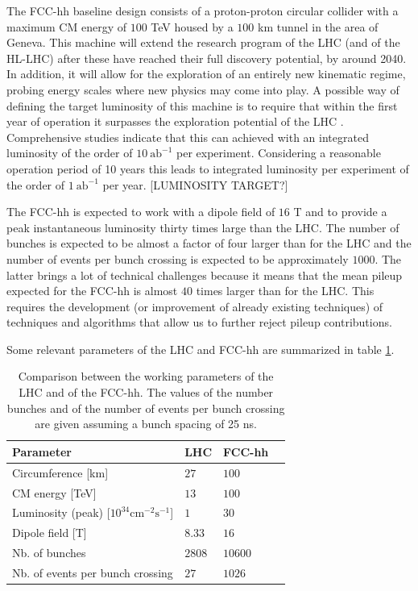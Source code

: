The FCC-hh baseline design consists of a proton-proton circular collider with a maximum CM energy of $100$ TeV housed by a $100$ km tunnel in the area of Geneva. This machine will extend the research program of the LHC (and of the HL-LHC) after these have reached their full discovery potential, by around 2040. In addition, it will allow for the exploration of an entirely new kinematic regime, probing energy scales where new physics may come into play. A possible way of defining the target luminosity of this machine is to require that within the first year of operation it surpasses the exploration potential of the LHC \cite{FCClumi}. Comprehensive studies \cite{FCCphys,FCClumi} indicate that this can achieved with an integrated luminosity of the order of $10~\text{ab}^{-1}$ per experiment. Considering a reasonable operation period of 10 years this leads to integrated luminosity per experiment of the order of $1~\text{ab}^{-1}$ per year. [LUMINOSITY TARGET?]

The FCC-hh is expected to work with a dipole field of $16$ T and to provide a peak instantaneous luminosity thirty times large than the LHC. The number of bunches is expected to be almost a factor of four larger than for the LHC and the number of events per bunch crossing is expected to be approximately $1000$. The latter brings a lot of technical challenges because it means that the mean pileup expected for the FCC-hh is almost $40$ times larger than for the LHC. This requires the development (or improvement of already existing techniques) of techniques and algorithms that allow us to further reject pileup contributions. 

Some relevant parameters of the LHC and FCC-hh are summarized in table \ref{table:FCCpara}.

\renewcommand{\arraystretch}{1.2}

\begin{table}
	\centering
	\caption{Comparison between the working parameters of the LHC and of the FCC-hh. The values of the number bunches and of the number of events per bunch crossing are given assuming a bunch spacing of 25 ns.}
	\begin{tabular}{llll}
		\toprule 
		\textbf{Parameter} & \textbf{LHC} & \textbf{FCC-hh} &  \\
		\midrule
		Circumference [km] & $27$ & $100$ &   \\
		\rowcolor{black!7} CM energy [TeV]  & $13$ & $100$ &  \\
		Luminosity (peak) [$\mathrm{10^{34} cm^{-2} s^{-1}}$] & $1$ & $30$ &   \\
		\rowcolor{black!7} Dipole field [T]  & $8.33$ & $16$  &  \\
		Nb. of bunches & $2808$ & $10600$ &   \\
		\rowcolor{black!7} Nb. of events per bunch crossing  & $27$ & $1026$ &  \\
		\bottomrule
	\end{tabular}
	\label{table:FCCpara}
\end{table}

